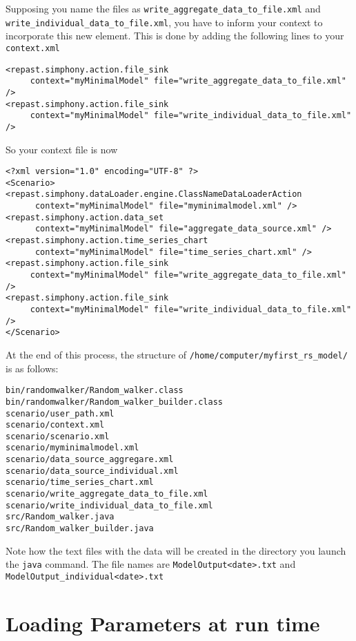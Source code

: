 \documentclass{article}
\begin{document}
Supposing you name the files as \verb+write_aggregate_data_to_file.xml+ and \verb+write_individual_data_to_file.xml+, you have to inform your context to incorporate this new element. This is done by adding the following lines to your \verb+context.xml+

\begin{verbatim}
<repast.simphony.action.file_sink 
     context="myMinimalModel" file="write_aggregate_data_to_file.xml" />
<repast.simphony.action.file_sink 
     context="myMinimalModel" file="write_individual_data_to_file.xml" />
\end{verbatim}

So your context file is now

\begin{verbatim}
<?xml version="1.0" encoding="UTF-8" ?>
<Scenario>
<repast.simphony.dataLoader.engine.ClassNameDataLoaderAction 
      context="myMinimalModel" file="myminimalmodel.xml" />
<repast.simphony.action.data_set 
      context="myMinimalModel" file="aggregate_data_source.xml" />
<repast.simphony.action.time_series_chart 
      context="myMinimalModel" file="time_series_chart.xml" />
<repast.simphony.action.file_sink 
     context="myMinimalModel" file="write_aggregate_data_to_file.xml" />
<repast.simphony.action.file_sink 
     context="myMinimalModel" file="write_individual_data_to_file.xml" />
</Scenario>
\end{verbatim}

At the end of this process, the structure of \verb+/home/computer/myfirst_rs_model/+ is as follows:
\begin{verbatim}
bin/randomwalker/Random_walker.class
bin/randomwalker/Random_walker_builder.class
scenario/user_path.xml
scenario/context.xml
scenario/scenario.xml
scenario/myminimalmodel.xml
scenario/data_source_aggregare.xml
scenario/data_source_individual.xml
scenario/time_series_chart.xml
scenario/write_aggregate_data_to_file.xml
scenario/write_individual_data_to_file.xml
src/Random_walker.java
src/Random_walker_builder.java
\end{verbatim}

Note how the text files with the data will be created in the directory you launch the \verb+java+ command.
The file names are \verb+ModelOutput<date>.txt+ and \verb+ModelOutput_individual<date>.txt+

\section{Loading Parameters at run time}
\end{document}
